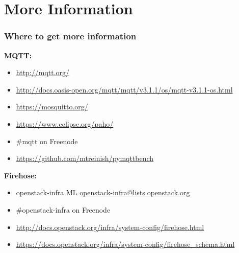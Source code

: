 \documentclass[aspectratio=169,11pt,hyperref={colorlinks=true}]{beamer}
\begin{document}
\section{More Information}
\begin{frame}
\frametitle{Where to get more information}
    \textbf{MQTT:}
    \begin{itemize}
	    \item \href{http://mqtt.org/}{http://mqtt.org/}
        \item \href{http://docs.oasis-open.org/mqtt/mqtt/v3.1.1/os/mqtt-v3.1.1-os.html}{http://docs.oasis-open.org/mqtt/mqtt/v3.1.1/os/mqtt-v3.1.1-os.html}
	    \item \href{https://mosquitto.org/}{https://mosquitto.org/}
        \item \href{https://www.eclipse.org/paho/}{https://www.eclipse.org/paho/}
        \item \#mqtt on Freenode
        \item \href{https://github.com/mtreinish/pymqttbench}{https://github.com/mtreinish/pymqttbench}
    \end{itemize}
    \textbf{Firehose:}
    \begin{itemize}
        \item openstack-infra ML\: \href{mailto:openstack-infra@lists.openstack.org}{openstack-infra@lists.openstack.org}
        \item \#openstack-infra on Freenode
	    \item \href{http://docs.openstack.org/infra/system-config/firehose.html}{http://docs.openstack.org/infra/system-config/firehose.html}
        \item \href{https://docs.openstack.org/infra/system-config/firehose_schema.html}{https://docs.openstack.org/infra/system-config/firehose\_schema.html}
    \end{itemize}
\end{frame}
\end{document}
